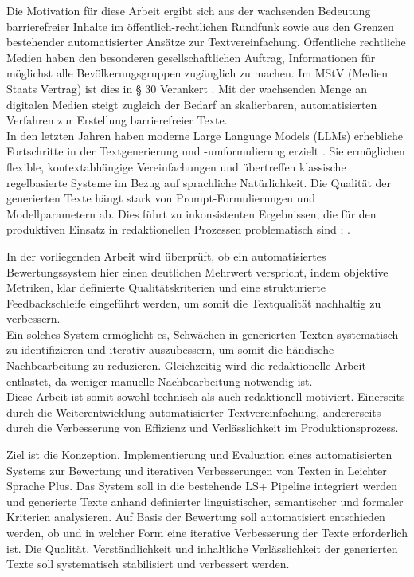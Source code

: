 Die Motivation für diese Arbeit ergibt sich aus der wachsenden Bedeutung barrierefreier Inhalte im öffentlich-rechtlichen Rundfunk sowie aus den Grenzen bestehender automatisierter Ansätze zur Textvereinfachung. 
Öffentliche rechtliche Medien haben den besonderen gesellschaftlichen Auftrag, Informationen für möglichst alle Bevölkerungsgruppen zugänglich zu machen. Im MStV (Medien Staats Vertrag) ist dies in § 30 Verankert \cite{mstv_par30}.
Mit der wachsenden Menge an digitalen Medien steigt zugleich der Bedarf an skalierbaren, automatisierten Verfahren zur Erstellung barrierefreier Texte.\\
In den letzten Jahren haben moderne Large Language Models (LLMs) erhebliche Fortschritte in der Textgenerierung und -umformulierung erzielt \cite[S. 227]{bluthgen_technische_2025}.
Sie ermöglichen flexible, kontextabhängige Vereinfachungen und übertreffen klassische regelbasierte Systeme im Bezug auf sprachliche Natürlichkeit.
Die Qualität der generierten Texte hängt stark von Prompt-Formulierungen und Modellparametern ab.
Dies führt zu inkonsistenten Ergebnissen, die für den produktiven Einsatz in redaktionellen Prozessen problematisch sind \cite[S. 227]{bluthgen_technische_2025}; \cite[S.116]{bommasani_opportunities_2022}.

In der vorliegenden Arbeit wird überprüft, ob ein automatisiertes Bewertungssystem hier einen deutlichen Mehrwert verspricht, indem objektive Metriken, klar definierte Qualitätskriterien und eine strukturierte Feedbackschleife eingeführt werden, um somit die Textqualität nachhaltig zu verbessern. \\
Ein solches System ermöglicht es, Schwächen in generierten Texten systematisch zu identifizieren und iterativ auszubessern, um somit die händische Nachbearbeitung zu reduzieren.
Gleichzeitig wird die redaktionelle Arbeit entlastet, da weniger manuelle Nachbearbeitung notwendig ist. \\
Diese Arbeit ist somit sowohl technisch als auch redaktionell motiviert.
Einerseits durch die Weiterentwicklung automatisierter Textvereinfachung, andererseits durch die Verbesserung von Effizienz und Verlässlichkeit im Produktionsprozess.

Ziel ist die Konzeption, Implementierung und Evaluation eines automatisierten Systems zur Bewertung und iterativen Verbesserungen von Texten in Leichter Sprache Plus.
Das System soll in die bestehende LS+ Pipeline integriert werden und generierte Texte anhand definierter linguistischer, semantischer und formaler Kriterien analysieren.
Auf Basis der Bewertung soll automatisiert entschieden werden, ob und in welcher Form eine iterative Verbesserung der Texte erforderlich ist.
Die Qualität, Verständlichkeit und inhaltliche Verlässlichkeit der generierten Texte soll systematisch stabilisiert und verbessert werden.